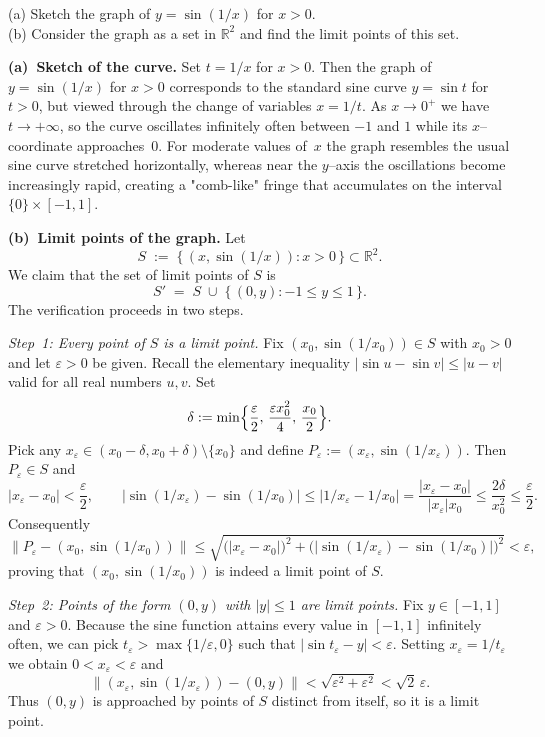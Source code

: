 \documentclass[10pt]{extarticle}
\begin{document}
\begin{exercise}[4.2]
    (a) Sketch the graph of $y=\sin(1/x)$ for $x>0$.\\
    (b) Consider the graph as a set in $\mathbb{R}^2$ and find the limit points of this set.
\end{exercise}
\begin{solution}
    \textbf{(a)~Sketch of the curve.}  Set $t = 1/x$ for $x>0$.  Then the graph of $y = \sin(1/x)$ for $x>0$ corresponds to the standard sine curve $y = \sin t$ for $t>0$, but viewed through the change of variables $x = 1/t$.  As $x \to 0^{+}$ we have $t \to +\infty$, so the curve oscillates infinitely often between $-1$ and $1$ while its $x$--coordinate approaches~$0$.  For moderate values of~$x$ the graph resembles the usual sine curve stretched horizontally, whereas near the $y$--axis the oscillations become increasingly rapid, creating a "comb-like" fringe that accumulates on the interval $\{0\}\times[-1,1]$.

    \medskip
    \textbf{(b)~Limit points of the graph.}  Let
    $$
        S \;:=\; \bigl\{\,(x,\sin(1/x)) : x>0\,\bigr\}\subset \mathbb{R}^{2}.
    $$
    We claim that the set of limit points of $S$ is
    $$
        S' \;=\; S \;\cup\; \bigl\{\,(0,y) : -1 \le y \le 1\,\bigr\}.
    $$
    The verification proceeds in two steps.

    \medskip
    \emph{Step~1:  Every point of $S$ is a limit point.}  Fix $(x_{0},\sin(1/x_{0})) \in S$ with $x_{0}>0$ and let $\varepsilon>0$ be given.  Recall the elementary inequality $|\sin u-\sin v|\le |u-v|$ valid for all real numbers $u,v$.  Set
    $$
        \delta := \min\Bigl\{\frac{\varepsilon}{2},\, \frac{\varepsilon x_{0}^{2}}{4},\, \frac{x_{0}}{2}\Bigr\}.
    $$
    Pick any $x_{\varepsilon}\in(x_{0}-\delta,x_{0}+\delta)\setminus\{x_{0}\}$ and define $P_{\varepsilon}:=(x_{\varepsilon},\sin(1/x_{\varepsilon}))$.  Then $P_{\varepsilon}\in S$ and
    $$
        |x_{\varepsilon}-x_{0}|<\frac{\varepsilon}{2},\qquad |\sin(1/x_{\varepsilon})-\sin(1/x_{0})|\le |1/x_{\varepsilon}-1/x_{0}|=\frac{|x_{\varepsilon}-x_{0}|}{|x_{\varepsilon}|x_{0}}\le \frac{2\delta}{x_{0}^{2}}\le \frac{\varepsilon}{2}.
    $$
    Consequently
    $$
        \bigl\|P_{\varepsilon}-(x_{0},\sin(1/x_{0}))\bigr\|\le \sqrt{\bigl(|x_{\varepsilon}-x_{0}|\bigr)^{2}+\bigl(|\sin(1/x_{\varepsilon})-\sin(1/x_{0})|\bigr)^{2}}<\varepsilon,
    $$
    proving that $(x_{0},\sin(1/x_{0}))$ is indeed a limit point of $S$.

    \medskip
    \emph{Step~2:  Points of the form $(0,y)$ with $|y|\le 1$ are limit points.}  Fix $y\in[-1,1]$ and $\varepsilon>0$.  Because the sine function attains every value in $[-1,1]$ infinitely often, we can pick $t_{\varepsilon}>\max\{1/\varepsilon,0\}$ such that $|\sin t_{\varepsilon}-y|<\varepsilon$.  Setting $x_{\varepsilon}=1/t_{\varepsilon}$ we obtain $0<x_{\varepsilon}<\varepsilon$ and
    $$
        \bigl\|(x_{\varepsilon},\sin(1/x_{\varepsilon}))-(0,y)\bigr\|<\sqrt{\varepsilon^{2}+\varepsilon^{2}}<\sqrt{2}\,\varepsilon.
    $$
    Thus $(0,y)$ is approached by points of $S$ distinct from itself, so it is a limit point.


\end{solution}
\end{document}
